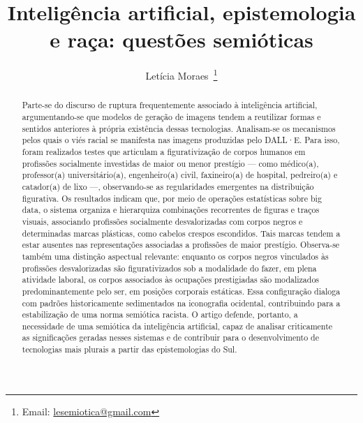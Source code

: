 \documentclass[portuguese]{textolivre}
\title{Inteligência artificial, epistemologia e raça: questões semióticas}
\author[1]{Letícia Moraes~\orcid{0000-0002-4642-5974}\thanks{Email: \href{mailto:lesemiotica@gmail.com}{lesemiotica@gmail.com}}}
\affil[1]{Universidade Federal da Paraíba, Centro de Ciências Humanas, Letras e Artes, Departamento de Linguística e Língua Portuguesa, João Pessoa, Paraíba, Brasil.}
\begin{document}
\maketitle

\begin{polyabstract}
\begin{abstract}
Parte-se do discurso de ruptura frequentemente associado à inteligência artificial, argumentando-se que modelos de geração de imagens tendem a reutilizar formas e sentidos anteriores à própria existência dessas tecnologias. Analisam-se os mecanismos pelos quais o viés racial se manifesta nas imagens produzidas pelo DALL·E. Para isso, foram realizados testes que articulam a figurativização de corpos humanos em profissões socialmente investidas de maior ou menor prestígio — como médico(a), professor(a) universitário(a), engenheiro(a) civil, faxineiro(a) de hospital, pedreiro(a) e catador(a) de lixo —, observando-se as regularidades emergentes na distribuição figurativa. Os resultados indicam que, por meio de operações estatísticas sobre big data, o sistema organiza e hierarquiza combinações recorrentes de figuras e traços visuais, associando profissões socialmente desvalorizadas com corpos negros e determinadas marcas plásticas, como cabelos crespos escondidos. Tais marcas tendem a estar ausentes nas representações associadas a profissões de maior prestígio. Observa-se também uma distinção aspectual relevante: enquanto os corpos negros vinculados às profissões desvalorizadas são figurativizados sob a modalidade do fazer, em plena atividade laboral, os corpos associados às ocupações prestigiadas são modalizados predominantemente pelo ser, em posições corporais estáticas. Essa configuração dialoga com padrões historicamente sedimentados na iconografia ocidental, contribuindo para a estabilização de uma norma semiótica racista. O artigo defende, portanto, a necessidade de uma semiótica da inteligência artificial, capaz de analisar criticamente as significações geradas nesses sistemas e de contribuir para o desenvolvimento de tecnologias mais plurais a partir das epistemologias do Sul.

\end{abstract}


\end{polyabstract}
\end{document}
